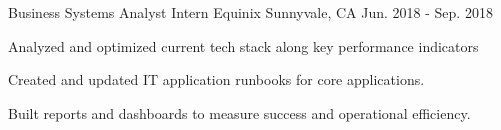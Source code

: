 \begin{cventries}
  \cventry
    {Business Systems Analyst Intern} %
    {Equinix} %
    {Sunnyvale, CA} %
    {Jun. 2018 - Sep. 2018} %
    {
      \begin{cvitems} %
        \item {Analyzed and optimized current tech stack along key performance indicators}
        \item {Created and updated IT application runbooks for core applications.}
        \item {Built reports and dashboards to measure success and operational efficiency.}
      \end{cvitems}
    }

\end{cventries}
